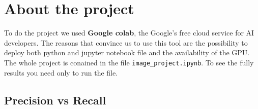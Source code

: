 \section{About the project}

To do the project we used \textbf{Google colab}, the Google's free cloud service for AI developers. The reasons that convince us to use this tool are the possibility to deploy both python and jupyter notebook file and the availability of the GPU. \\
The whole project is conained in the file \texttt{image\_project.ipynb}. To see the fully results you need only to run the file.

\subsection{Precision vs Recall}